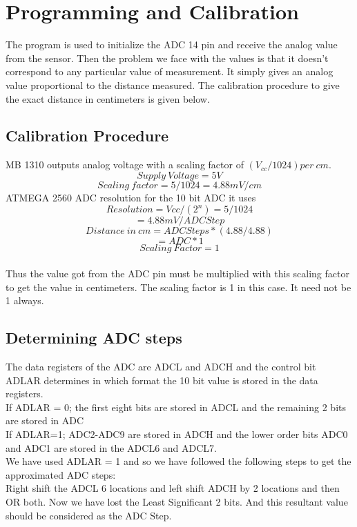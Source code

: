 \documentclass[a4paper,29.6pt]{article}
\begin{document}
\section{Programming and Calibration}
The program is used to initialize the ADC 14 pin and receive the analog value from the sensor. Then the problem we face with the values is that it doesn't correspond to any particular value of measurement. It simply gives an analog value proportional to the distance measured. The calibration procedure to give the exact distance in centimeters is given below.

\subsection{Calibration Procedure}
\begin{small}
MB 1310 outputs analog voltage with a scaling factor of $(V_{cc}/1024)per\: cm$.
	 $$Supply\: Voltage = 5V$$
		 $$Scaling\: factor= 5/1024 = 4.88mV/cm$$
		 ATMEGA 2560 ADC resolution for the 10 bit ADC it uses $$ Resolution = Vcc/(2^n) =5/1024$$ $$= 4.88mV/ADC Step$$
		 $$Distance\: in\: cm = ADC Steps * (4.88/4.88)$$ $$= ADC * 1$$ 
		 $$Scaling\: Factor = 1$$\\
		Thus the value got from the ADC pin must be multiplied with this scaling factor to get the value in centimeters. The scaling factor is 1 in this case. It need not be 1 always.
\end{small}
\subsection{Determining ADC steps}
\begin{small}
The data registers of the ADC are ADCL and ADCH and the control bit ADLAR determines in which format the 10 bit value is stored in the data registers.\\
If ADLAR = 0;	the first eight bits are stored in ADCL and the remaining 2 bits are stored in ADC\\
If ADLAR=1;	ADC2-ADC9 are stored in ADCH and the lower order bits ADC0 and ADC1 are stored in the ADCL6 and ADCL7.  \\
We have used ADLAR = 1 and so we have followed the following steps to get the approximated ADC steps:\\
	Right shift the ADCL 6 locations and left shift ADCH by 2 locations and then OR both. 
	Now we have lost the Least Significant 2 bits. 
	And this resultant value should be considered as the ADC Step.

\end{small}
\newpage
\end{document}
